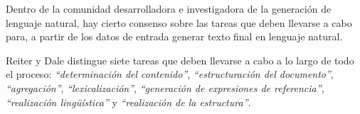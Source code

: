 Dentro de la comunidad desarrolladora e investigadora de la generación de lenguaje natural, hay cierto consenso sobre las tareas que deben llevarse a cabo para, a partir de los datos de entrada generar texto final en lenguaje natural. 

Reiter y Dale distingue siete tareas que deben llevarse a cabo a lo largo de todo el proceso: \emph{``determinación del contenido''}, \emph{``estructuración del documento''}, \emph{``agregación''}, \emph{``lexicalización''}, \emph{``generación de expresiones de referencia''}, \emph{``realización lingüística''} y \emph{``realización de la estructura''}.

\begin{comment}
\textbf{Determinación del contenido:} es el proceso de determinar que información debe ser comunicada en el texto final. 

\textbf{Estructuración del documento:} es el proceso de imponer un orden y estructura sobre los textos generados. 

\textbf{Agregación:} Es el proceso de agrupar mensajes para formar nuevas frases.

\textbf{Lexicalización:} Es el proceso de decidir que palabras y frases especificas usar para expresar los distintos conceptos y relaciones del dominio.

\textbf{Generación de expresiones de referencia:} es la tarea de elegir que palabras y frases usar para identificar entidades del dominio de aplicación.

\textbf{Realización lingüística:} es el proceso de aplicar reglas gramaticales para producir texto que sea sintáctica, morfológica y ortográficamente correcto.

\textbf{Realización de la estructura:} es la tarea de convertir estructuras abstractas, como párrafos y secciones, en símbolos marcados comprensibles por el componente de presentación del documento.

Hay varias cuestiones que deben abordarse para poder producir un texto a partir de una entrada dada. Reiter y Dale\cite{reiterdale} proponen descomponer este proceso en tres módulos conceptuales: \emph{``documment planning''}, \emph{``microplanning''} y \emph{``realization''}. Y en una categorización más fina se puede dividir el procesamiento realizado por estos módulos en termino de tareas de \emph{determinación de contenido}, \emph{estructuración del documento}, \emph{lexicalización}, \emph{agregación}, \emph{generación de expresiones de referencia}, \emph{realización lingüística} y \emph{realización de estructura}.


\end{comment}
